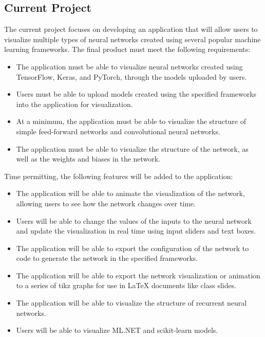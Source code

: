 \documentclass[letterpaper, 12pt]{report}
\begin{document}
\subsection*{Current Project}
The current project focuses on developing an application that will allow users to visualize multiple types of neural networks created using several popular machine learning frameworks. The final product must meet the following requirements:
\begin{itemize}
    \item The application must be able to visualize neural networks created using TensorFlow, Keras, and PyTorch, through the models uploaded by users.\item Users must be able to upload models created using the specified frameworks into the application for visualization.
    \item At a minimum, the application must be able to visualize the structure of simple feed-forward networks and convolutional neural networks.
    \item The application must be able to visualize the structure of the network, as well as the weights and biases in the network.
\end{itemize}
Time permitting, the following features will be added to the application:
\begin{itemize}
    \item The application will be able to animate the visualization of the network, allowing users to see how the network changes over time.
    \item Users will be able to change the values of the inputs to the neural network and update the visualization in real time using input sliders and text boxes.
    \item The application will be able to export the configuration of the network to code to generate the network in the specified frameworks.
    \item The application will be able to export the network visualization or animation to a series of tikz graphs for use in LaTeX documents like class slides.
    \item The application will be able to visualize the structure of recurrent neural networks.
    \item Users will be able to visualize ML.NET and scikit-learn models.
\end{itemize}
\end{document}
